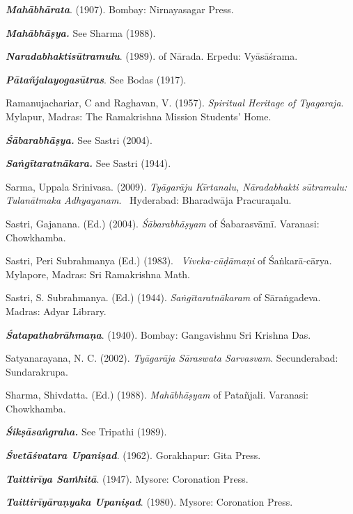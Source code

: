 \begin{thebibliography}{99}
  \textbf{\textit{Mahābhārata}}. (1907). Bombay: Nirnayasagar Press. 

  \textbf{\textit{Mahābhāṣya.}} See Sharma (1988).

  \textbf{\textit{Naradabhaktisūtramulu}}. (1989). of Nārada. Erpedu: Vyāsāśrama.

  \textbf{\textit{Pātañjalayogasūtras}}. See Bodas (1917).

  Ramanujachariar, C and Raghavan, V. (1957). \textit{Spiritual Heritage of Tyagaraja}. Mylapur, Madras: The Ramakrishna Mission Students’ Home.

  \textbf{\textit{Śābarabhāṣya.}} See Sastri (2004).

  \textbf{\textit{Saṅgītaratnākara.}} See Sastri (1944).

  Sarma, Uppala Srinivasa. (2009). \textit{Tyāgarāju Kīrtanalu, Nāradabhakti sūtramulu: Tulanātmaka Adhyayanam}.  Hyderabad: Bharadwāja Pracuraṇalu.

  Sastri, Gajanana. (Ed.) (2004). \textit{Śābarabhāṣyam} of Śabarasvāmī. Varanasi: Chowkhamba.

  Sastri, Peri Subrahmanya (Ed.) (1983).  \textit{Viveka-cūḍāmaṇi} of Śaṅkarā-\break cārya. Mylapore, Madras: Sri Ramakrishna Math.

  Sastri, S. Subrahmanya. (Ed.) (1944). \textit{Saṅgītaratnākaram} of Sāraṅgadeva. Madras: Adyar Library. 

  \textbf{\textit{Śatapathabrāhmaṇa}}. (1940). Bombay: Gangavishnu Sri Krishna Das.

  Satyanarayana, N. C. (2002). \textit{Tyāgarāja Sāraswata Sarvasvam}. Secunderabad: Sundarakrupa. 

  Sharma, Shivdatta. (Ed.) (1988). \textit{Mahābhāṣyam} of Patañjali. Varanasi: Chowkhamba.

  \textbf{\textit{Śikṣāsaṅgraha.}} See Tripathi (1989).

  \textbf{\textit{Śvetāśvatara Upaniṣad}}. (1962). Gorakhapur: Gita Press.

  \textbf{\textit{Taittirīya Saṁhitā}}. (1947). Mysore: Coronation Press.

  \textbf{\textit{Taittirīyāraṇyaka Upaniṣad}}. (1980). Mysore: Coronation Press. 


\end{thebibliography}
